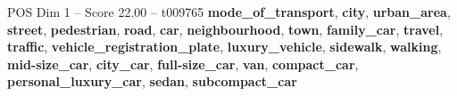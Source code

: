\begin{textsample}{POS Dim 1 – Score 22.00 – t009765}  \label{ex:f1_pos_010}
\textbf{mode\_of\_transport}, \textbf{city}, \textbf{urban\_area}, \textbf{street}, \textbf{pedestrian}, \textbf{road}, \textbf{car}, \textbf{neighbourhood}, \textbf{town}, \textbf{family\_car}, \textbf{travel}, \textbf{traffic}, \textbf{vehicle\_registration\_plate}, \textbf{luxury\_vehicle}, \textbf{sidewalk}, \textbf{walking}, \textbf{mid-size\_car}, \textbf{city\_car}, \textbf{full-size\_car}, \textbf{van}, \textbf{compact\_car}, \textbf{personal\_luxury\_car}, \textbf{sedan}, \textbf{subcompact\_car}

\end{textsample}
